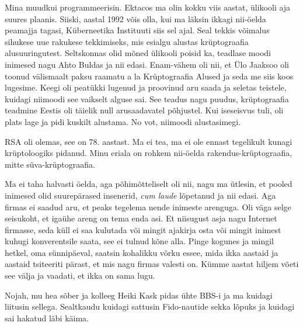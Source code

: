 
Mina muudkui programmeerisin. Ektacos ma olin kokku viis aastat, 
ülikooli aja suures plaanis. Siiski, aastal 1992  võis olla,  kui ma läksin 
ikkagi nii-öelda peamajja tagasi,  Küberneetika Instituuti siis sel ajal. Seal tekkis võimalus sihukese uue rakukese 
tekkimiseks, mis esialgu alustas krüptograafia alusuuringutest. Seltskonnas 
olid mõned ülikooli  poisid ka,  teadlase moodi inimesed nagu Ahto Buldas ja 
nii edasi.  Enam-vähem oli nii, et  Ülo Jaaksoo oli 
toonud välismaalt paksu raamatu a la Krüptograafia Alused ja seda me siis koos 
lugesime. Keegi oli peatükki lugenud ja proovinud aru saada ja  seletas 
teistele, kuidagi niimoodi see vaikselt alguse sai. See teadus nagu puudus, 
krüptograafia teadmine Eestis oli täielik null arusaadavatel põhjustel. Kui 
iseseisvus tuli, oli plats lage ja pidi kuskilt alustama. No vot, niimoodi 
alustasimegi. 


RSA oli olemas, see on 78. aastast. Ma ei tea, ma ei ole ennast tegelikult 
kunagi krüptoloogiks pidanud. Minu eriala on rohkem  nii-öelda 
rakendus-krüptograafia, mitte  süva-krüptograafia.


Ma ei taha halvasti öelda, aga põhimõtteliselt oli nii, nagu ma ütlesin, et 
pooled inimesed olid suurepärased insenerid, \emph{cum laude} lõpetanud ja nii 
edasi. Aga firmas ei saadud aru, et  peaks tegelema nende inimeste arenguga. 
Oli väga selge seisukoht, et igaühe areng on tema enda asi. Et niisugust asja 
nagu Internet firmasse, seda küll ei saa kulutada või mingit ajakirja osta või 
mingit inimest kuhugi konverentsile saata, see ei tulnud kõne alla. Pinge 
kogunes ja mingil hetkel, oma sünnipäeval,  saatsin kohalikku võrku essee, mida 
ikka aastaid ja aastaid tsiteeriti pärast, et  mis nagu firmas valesti on. 
Kümme aastat hiljem võeti see välja ja vaadati, et ikka on sama lugu. 


Nojah, mu hea sõber ja kolleeg Heiki Kask pidas ühte 
BBS-i ja ma kuidagi liitusin sellega. Sealtkaudu kuidagi sattusin  Fido-nautide 
sekka lõpuks ja kuidagi sai hakatud läbi käima. 

